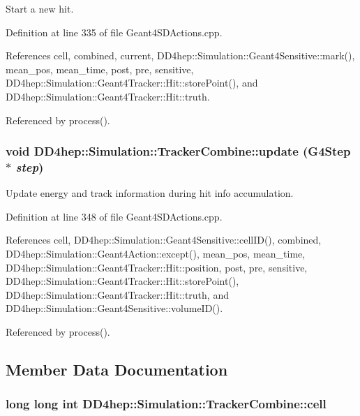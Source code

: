 Start a new hit. 

Definition at line 335 of file Geant4SDActions.cpp.

References cell, combined, current, DD4hep::Simulation::Geant4Sensitive::mark(), mean\_\-pos, mean\_\-time, post, pre, sensitive, DD4hep::Simulation::Geant4Tracker::Hit::storePoint(), and DD4hep::Simulation::Geant4Tracker::Hit::truth.

Referenced by process().\hypertarget{struct_d_d4hep_1_1_simulation_1_1_tracker_combine_a3bd30148dcc0b7fa917b000c9946e77f}{
\subsubsection[{update}]{\setlength{\rightskip}{0pt plus 5cm}void DD4hep::Simulation::TrackerCombine::update (G4Step $\ast$ {\em step})}}
\label{struct_d_d4hep_1_1_simulation_1_1_tracker_combine_a3bd30148dcc0b7fa917b000c9946e77f}


Update energy and track information during hit info accumulation. 

Definition at line 348 of file Geant4SDActions.cpp.

References cell, DD4hep::Simulation::Geant4Sensitive::cellID(), combined, DD4hep::Simulation::Geant4Action::except(), mean\_\-pos, mean\_\-time, DD4hep::Simulation::Geant4Tracker::Hit::position, post, pre, sensitive, DD4hep::Simulation::Geant4Tracker::Hit::storePoint(), DD4hep::Simulation::Geant4Tracker::Hit::truth, and DD4hep::Simulation::Geant4Sensitive::volumeID().

Referenced by process().

\subsection{Member Data Documentation}
\hypertarget{struct_d_d4hep_1_1_simulation_1_1_tracker_combine_a93f684a7d6865b0f92a82560b3558d0d}{
\subsubsection[{cell}]{\setlength{\rightskip}{0pt plus 5cm}long long int {\bf DD4hep::Simulation::TrackerCombine::cell}}}
\label{struct_d_d4hep_1_1_simulation_1_1_tracker_combine_a93f684a7d6865b0f92a82560b3558d0d}


